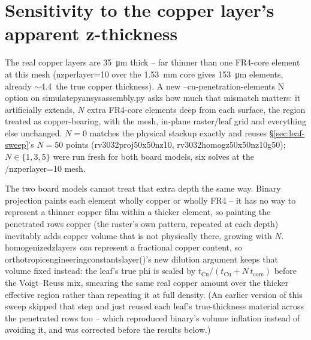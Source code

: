 \documentclass[10pt,a4paper]{article}
\newcommand{\brkus}{\textunderscore\allowbreak}
\newcommand{\code}[1]{{\small\ttfamily\let\_\brkus #1}}
\newcommand{\mod}[1]{\code{#1}}
\begin{document}
\section{Sensitivity to the copper layer's apparent z-thickness}
The real copper layers are \SI{35}{\micro\metre} thick -- far thinner than one FR4-core element at
this mesh (\code{nz\_per\_layer=10} over the \SI{1.53}{\milli\metre} core gives \SI{153}{\micro\metre}
elements, already $\sim$\num{4.4}\texttimes\ the true copper thickness). A new
\code{--cu-penetration-elements N} option on \mod{simulate\_pyansys\_assembly.py} asks how much that
mismatch matters: it artificially extends, $N$ extra FR4-core elements deep from each surface, the
region treated as copper-bearing, with the mesh, in-plane raster/leaf grid and everything else
unchanged. $N=0$ matches the physical stackup exactly and reuses \S\ref{sec:leaf-sweep}'s $N=50$
points (\code{rv3032\_proj\_50x50\_nz10}, \code{rv3032\_homogz\_50x50\_nz10\_g50}); $N \in \{1, 3, 5\}$ were run
fresh for both board models, six solves at the /\code{nz\_per\_layer=10} mesh.

The two board models cannot treat that extra depth the same way. Binary projection paints each
element wholly copper or wholly FR4 -- it has no way to represent a thinner copper film within a
thicker element, so painting the penetrated rows copper (the raster's own pattern, repeated at each
depth) inevitably adds copper volume that is not physically there, growing with $N$.
\code{homogenized\_zlayers} \emph{can} represent a fractional copper content, so
\code{orthotropic\_engineering\_constants\_layer()}'s new \code{dilution} argument keeps that volume
fixed instead: the leaf's true phi is scaled by $t_\mathrm{Cu}/(t_\mathrm{Cu} + N\,t_\mathrm{core})$
before the Voigt--Reuss mix, smearing the same real copper amount over the thicker effective region
rather than repeating it at full density. (An earlier version of this sweep skipped that step and
just reused each leaf's true-thickness material across the penetrated rows too -- which reproduced
binary's volume inflation instead of avoiding it, and was corrected before the results below.)
\end{document}
